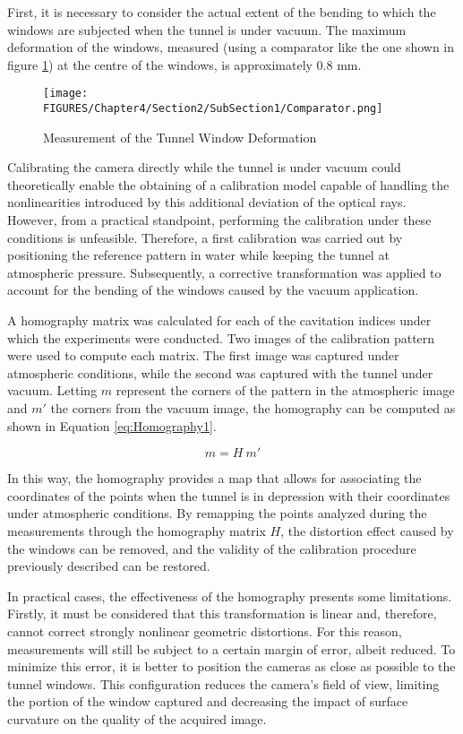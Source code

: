 First, it is necessary to consider the actual extent of the bending to which the windows are subjected when the tunnel is under vacuum. The maximum deformation of the windows, measured (using a comparator like the one shown in figure \ref{fig:Comparator}) at the centre of the windows, is approximately $0.8$ mm.

\begin{figure}[htbp]
  \centering
  \texttt{[image: FIGURES/Chapter4/Section2/SubSection1/Comparator.png]} 
  \caption{Measurement of the Tunnel Window Deformation} 
  \label{fig:Comparator}  
\end{figure}

Calibrating the camera directly while the tunnel is under vacuum could theoretically enable the obtaining of a calibration model capable of handling the nonlinearities introduced by this additional deviation of the optical rays.  
However, from a practical standpoint, performing the calibration under these conditions is unfeasible. Therefore, a first calibration was carried out by positioning the reference pattern in water while keeping the tunnel at atmospheric pressure. Subsequently, a corrective transformation was applied to account for the bending of the windows caused by the vacuum application.

A homography matrix was calculated for each of the cavitation indices under which the experiments were conducted. Two images of the calibration pattern were used to compute each matrix. The first image was captured under atmospheric conditions, while the second was captured with the tunnel under vacuum.  
Letting $m$ represent the corners of the pattern in the atmospheric image and $m'$ the corners from the vacuum image, the homography can be computed as shown in Equation \ref{eq:Homography1}.

\begin{equation}
  \label{eq:Homography1}
  m = H \ m' 
\end{equation}

In this way, the homography provides a map that allows for associating the coordinates of the points when the tunnel is in depression with their coordinates under atmospheric conditions. By remapping the points analyzed during the measurements through the homography matrix $H$, the distortion effect caused by the windows can be removed, and the validity of the calibration procedure previously described can be restored.

In practical cases, the effectiveness of the homography presents some limitations. Firstly, it must be considered that this transformation is linear and, therefore, cannot correct strongly nonlinear geometric distortions. For this reason, measurements will still be subject to a certain margin of error, albeit reduced. To minimize this error, it is better to position the cameras as close as possible to the tunnel windows. This configuration reduces the camera's field of view, limiting the portion of the window captured and decreasing the impact of surface curvature on the quality of the acquired image.


